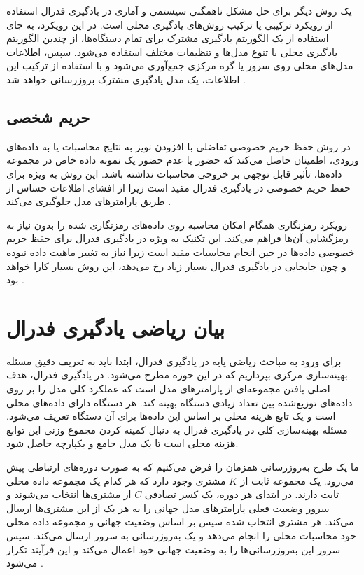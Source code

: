 یک روش دیگر برای حل مشکل ناهمگنی سیستمی و آماری در یادگیری فدرال استفاده از رویکرد ترکیبی یا ترکیب روش‌های یادگیری محلی است. در این رویکرد، به جای استفاده از یک الگوریتم یادگیری مشترک برای تمام دستگاه‌ها، از چندین الگوریتم یادگیری محلی با تنوع مدل‌ها و تنظیمات مختلف استفاده می‌شود. سپس، اطلاعات مدل‌های محلی روی سرور یا گره مرکزی جمع‌آوری می‌شود و با استفاده از ترکیب این اطلاعات، یک مدل یادگیری مشترک بروزرسانی خواهد شد
\cite{konevcny2015federated}.


\subsection{حریم شخصی}
در روش حفظ حریم خصوصی تفاضلی%
با افزودن نویز به نتایج محاسبات یا به داده‌های ورودی، اطمینان حاصل می‌کند که حضور یا عدم حضور یک نمونه داده خاص در مجموعه داده‌ها، تأثیر قابل توجهی بر خروجی محاسبات نداشته باشد. این روش به ویژه برای حفظ حریم خصوصی در یادگیری فدرال مفید است زیرا از افشای اطلاعات حساس از طریق پارامترهای مدل جلوگیری می‌کند
\cite{hasan2023security}.

رویکرد رمزنگاری همگام امکان محاسبه روی داده‌های رمزنگاری شده را بدون نیاز به رمزگشایی آن‌ها فراهم می‌کند. این تکنیک به ویژه در یادگیری فدرال برای حفظ حریم خصوصی داده‌ها در حین انجام محاسبات مفید است زیرا نیاز به تغییر ماهیت داده نبوده و چون جابجایی در یادگیری فدرال بسیار زیاد رخ می‌دهد، این روش بسیار کارا خواهد بود
\cite{yin2021comprehensive}.



\section{بیان ریاضی یادگیری فدرال}
برای ورود به مباحث ریاضی پایه در یادگیری فدرال، ابتدا باید به تعریف دقیق مسئله بهینه‌سازی مرکزی بپردازیم که در این حوزه مطرح می‌شود. در یادگیری فدرال، هدف اصلی یافتن مجموعه‌ای از پارامترهای مدل است که عملکرد کلی مدل را بر روی داده‌های توزیع‌شده بین تعداد زیادی دستگاه بهینه کند. هر دستگاه دارای داده‌های محلی است و یک تابع هزینه محلی بر اساس این داده‌ها برای آن دستگاه تعریف می‌شود. مسئله بهینه‌سازی کلی در یادگیری فدرال به دنبال کمینه کردن مجموع وزنی این توابع هزینه محلی است تا یک مدل جامع و یکپارچه حاصل شود.

ما یک طرح به‌روزرسانی همزمان را فرض می‌کنیم که به صورت دوره‌های ارتباطی پیش می‌رود. یک مجموعه ثابت از
$K$
مشتری وجود دارد که هر کدام یک مجموعه داده محلی ثابت دارند. در ابتدای هر دوره، یک کسر تصادفی
$C$
از مشتری‌ها انتخاب می‌شوند و سرور وضعیت فعلی پارامترهای مدل جهانی را به هر یک از این مشتری‌ها ارسال می‌کند. هر مشتری انتخاب ‌شده سپس بر اساس وضعیت جهانی و مجموعه داده محلی خود محاسبات محلی را انجام می‌دهد و یک به‌روزرسانی به سرور ارسال می‌کند. سپس سرور این به‌روزرسانی‌ها را به وضعیت جهانی خود اعمال می‌کند و این فرآیند تکرار می‌شود
\cite{mcmahan2017communication}.

